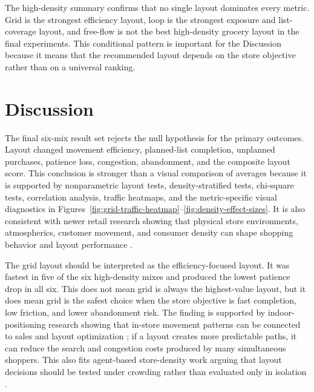 \documentclass[sigconf,nonacm]{acmart}
\begin{document}
The high-density summary confirms that no single layout dominates every metric. Grid is the strongest efficiency layout, loop is the strongest exposure and list-coverage layout, and free-flow is not the best high-density grocery layout in the final experiments. This conditional pattern is important for the Discussion because it means that the recommended layout depends on the store objective rather than on a universal ranking.

\clearpage

\section{Discussion}

The final six-mix result set rejects the null hypothesis for the primary outcomes. Layout changed movement efficiency, planned-list completion, unplanned purchases, patience loss, congestion, abandonment, and the composite layout score. This conclusion is stronger than a visual comparison of averages because it is supported by nonparametric layout tests, density-stratified tests, chi-square tests, correlation analysis, traffic heatmaps, and the metric-specific visual diagnostics in Figures~\ref{fig:grid-traffic-heatmap}--\ref{fig:density-effect-sizes}. It is also consistent with newer retail research showing that physical store environments, atmospherics, customer movement, and consumer density can shape shopping behavior and layout performance \citep{mari2013,spence2014,hwangbo2017,pantano2021}.

The grid layout should be interpreted as the efficiency-focused layout. It was fastest in five of the six high-density mixes and produced the lowest patience drop in all six. This does not mean grid is always the highest-value layout, but it does mean grid is the safest choice when the store objective is fast completion, low friction, and lower abandonment risk. The finding is supported by indoor-positioning research showing that in-store movement patterns can be connected to sales and layout optimization \citep{hwangbo2017}; if a layout creates more predictable paths, it can reduce the search and congestion costs produced by many simultaneous shoppers. This also fits agent-based store-density work arguing that layout decisions should be tested under crowding rather than evaluated only in isolation \citep{pantano2021}.
\end{document}
